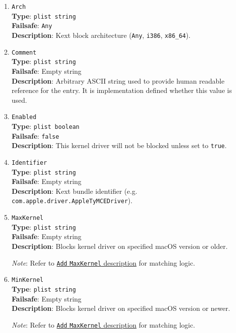 \documentclass[]{article}
\begin{document}
\begin{enumerate}
\item
  \texttt{Arch}\\
  \textbf{Type}: \texttt{plist\ string}\\
  \textbf{Failsafe}: \texttt{Any}\\
  \textbf{Description}: Kext block architecture (\texttt{Any}, \texttt{i386}, \texttt{x86\_64}).

\item
  \texttt{Comment}\\
  \textbf{Type}: \texttt{plist\ string}\\
  \textbf{Failsafe}: Empty string\\
  \textbf{Description}: Arbitrary ASCII string used to provide human readable
  reference for the entry. It is implementation defined whether this value is
  used.

\item
  \texttt{Enabled}\\
  \textbf{Type}: \texttt{plist\ boolean}\\
  \textbf{Failsafe}: \texttt{false}\\
  \textbf{Description}: This kernel driver will not be blocked unless set to
  \texttt{true}.

\item
  \texttt{Identifier}\\
  \textbf{Type}: \texttt{plist\ string}\\
  \textbf{Failsafe}: Empty string\\
  \textbf{Description}: Kext bundle identifier
    (e.g. \texttt{com.apple.driver.AppleTyMCEDriver}).

\item
  \texttt{MaxKernel}\\
  \textbf{Type}: \texttt{plist\ string}\\
  \textbf{Failsafe}: Empty string\\
  \textbf{Description}: Blocks kernel driver on specified macOS version or older.

  \emph{Note}: Refer to \hyperlink{kernmatch}{\texttt{Add} \texttt{MaxKernel} description} for matching logic.

\item
  \texttt{MinKernel}\\
  \textbf{Type}: \texttt{plist\ string}\\
  \textbf{Failsafe}: Empty string\\
  \textbf{Description}: Blocks kernel driver on specified macOS version or newer.

  \emph{Note}: Refer to \hyperlink{kernmatch}{\texttt{Add} \texttt{MaxKernel} description} for matching logic.

\end{enumerate}
\end{document}
